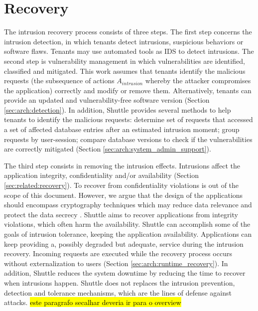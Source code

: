 \section{Recovery}
\label{sec:arch:recovery}
The intrusion recovery process consists of three steps. The first step concerns the intrusion detection, in which tenants detect intrusions, suspicious behaviors or software flaws. Tenants may use automated tools as \acf{IDS} \cite{itdb} to detect intrusions. The second step is vulnerability management in which vulnerabilities are identified, classified and mitigated. This work assumes that tenants identify the malicious requests (the subsequence of actions $A_{intrusion}$ whereby the attacker compromises the application) correctly and modify or remove them. Alternatively, tenants can provide an updated and vulnerability-free software version (Section \ref{sec:arch:detection}).
In addition, Shuttle provides several methods to help tenants to identify the malicious requests: determine set of requests that accessed a set of affected database entries  after an estimated intrusion moment; group requests by user-session; compare database versions to check if the vulnerabilities are correctly mitigated (Section \ref{sec:arch:system_admin_support}). 

The third step consists in removing the intrusion effects. Intrusions affect the application integrity, confidentiality and/or availability (Section \ref{sec:related:recovery}). To recover from confidentiality violations is out of the scope of this document. However, we argue that the design of the applications should encompass cryptography techniques which may reduce data relevance and protect the data secrecy \cite{Maheshwari2000}.
Shuttle aims to recover applications from integrity violations, which often harm the availability. Shuttle can accomplish some of the goals of intrusion tolerance, keeping the application availability. Applications can keep providing a, possibly degraded but adequate, service during the intrusion recovery. Incoming requests are executed while the recovery process occurs without externalization to users (Section \ref{sec:arch:runtime_recovery}). In addition, Shuttle reduces the system downtime by reducing the time to recover when intrusions happen. Shuttle does not replaces the intrusion prevention, detection and tolerance mechanisms, which are the lines of defense against attacks. \hl{este paragrafo secalhar deveria ir para o overview} \\

